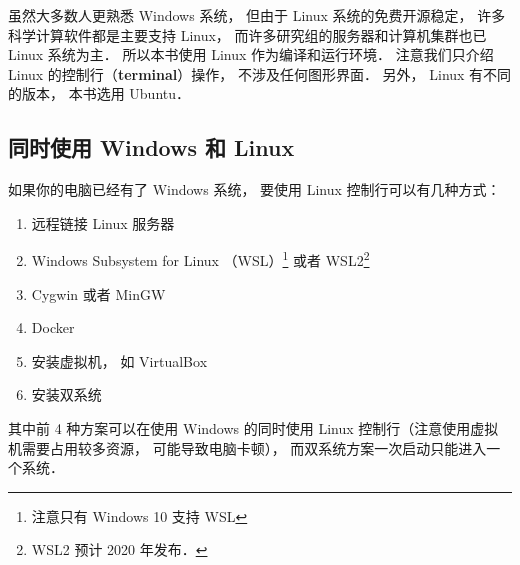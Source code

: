 
虽然大多数人更熟悉 Windows 系统， 但由于 Linux 系统的免费开源稳定， 许多科学计算软件都是主要支持 Linux， 而许多研究组的服务器和计算机集群也已 Linux 系统为主． 所以本书使用 Linux 作为编译和运行环境． 注意我们只介绍 Linux 的控制行（\textbf{terminal}）操作， 不涉及任何图形界面． 另外， Linux 有不同的版本， 本书选用 Ubuntu．

\subsection{同时使用 Windows 和 Linux}
如果你的电脑已经有了 Windows 系统， 要使用 Linux 控制行可以有几种方式：
\begin{enumerate}
\item 远程链接 Linux 服务器
\item Windows Subsystem for Linux （WSL）\footnote{注意只有 Windows 10 支持 WSL} 或者 WSL2\footnote{WSL2 预计 2020 年发布．}
\item Cygwin 或者 MinGW
\item Docker
\item 安装虚拟机， 如 VirtualBox
\item 安装双系统
\end{enumerate}
其中前 4 种方案可以在使用 Windows 的同时使用 Linux 控制行（注意使用虚拟机需要占用较多资源， 可能导致电脑卡顿）， 而双系统方案一次启动只能进入一个系统．

